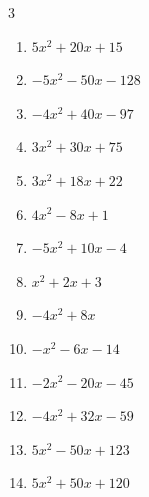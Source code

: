 \begin{multicols}{3}
\begin{enumerate}
  \item $5x^{2}+20x+15$


  \item $-5x^{2}-50x-128$


  \item $-4x^{2}+40x-97$


  \item $3x^{2}+30x+75$


  \item $3x^{2}+18x+22$


\columnbreak %

  \item $4x^{2}-8x+1$


  \item $-5x^{2}+10x-4$


  \item $x^{2}+2x+3$


  \item $-4x^{2}+8x$


  \item $-x^{2}-6x-14$


  \item $-2x^{2}-20x-45$


  \item $-4x^{2}+32x-59$


  \item $5x^{2}-50x+123$


  \item $5x^{2}+50x+120$


\end{enumerate}
\end{multicols}
